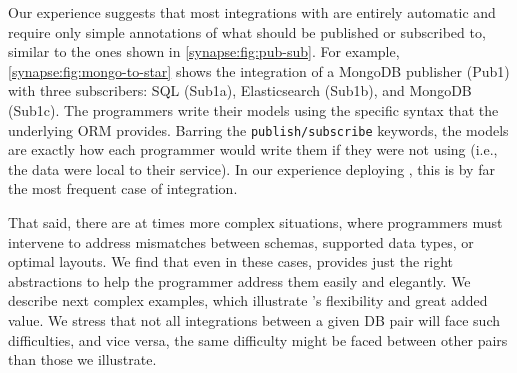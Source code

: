   Our experience suggests that most
integrations with \synapse are entirely automatic and require only simple
annotations of what should be published or subscribed to, similar to the ones shown
in \F\ref{synapse:fig:pub-sub}.  For example, \F\ref{synapse:fig:mongo-to-star} shows the
integration of a MongoDB publisher (Pub1) with three
subscribers: SQL (Sub1a), Elasticsearch (Sub1b), and
MongoDB (Sub1c). The programmers write their models using
the specific syntax that the underlying ORM
provides.  Barring the {\tt publish/subscribe} keywords, the
models are exactly how each programmer would write them if they were not using
\synapse (i.e., the data were local to their service).  In our experience
deploying \synapse, this is by far the most
frequent case of integration.

That said, there are at times more complex situations, where programmers must
intervene to address mismatches between schemas, supported data types, or
optimal layouts.  We find that even in these cases, \synapse provides just the
right abstractions to help the programmer address them easily and elegantly.
We describe next complex examples, which illustrate \synapse's flexibility
and great added value.  We stress that not all integrations between a given DB
pair will face such difficulties, and vice versa, the same difficulty might be
faced between other pairs than those we illustrate.


